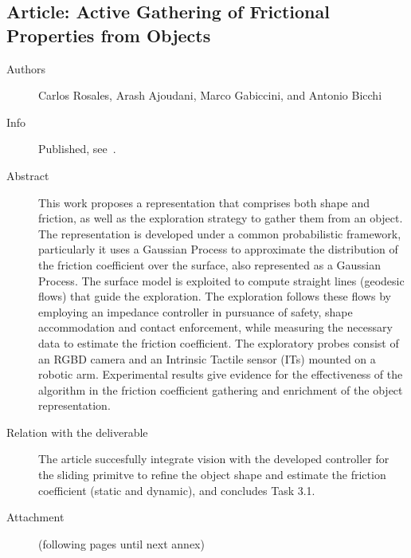 \documentclass[a4paper,11pt,pdf]{pacmanreport}
\begin{document}
\subsection{Article: Active Gathering of Frictional Properties from Objects} \label{sec:slidingPointClouds}
\begin{description}
	\item[Authors] Carlos Rosales, Arash Ajoudani, Marco Gabiccini, and Antonio Bicchi
	\item[Info] Published, see~\cite{Rosales2014Active}.
	\item[Abstract] This work proposes a representation that comprises both shape and friction, as well as the exploration strategy to gather them from an object. The representation is developed under a common probabilistic framework, particularly it uses a Gaussian Process to approximate the distribution of the friction coefficient over the surface, also represented as a Gaussian Process. The surface model is exploited to compute straight lines (geodesic flows) that guide the exploration. The exploration follows these flows by employing an impedance
controller in pursuance of safety, shape accommodation and contact enforcement, while measuring the necessary data to estimate the friction coefficient. The exploratory probes consist of an RGBD camera and an Intrinsic Tactile sensor (ITs) mounted on a robotic arm. Experimental results give evidence for the effectiveness of the algorithm in the friction coefficient gathering and enrichment of the object representation.
	\item[Relation with the deliverable] The article succesfully integrate vision with the developed controller for the sliding primitve to refine the object shape and estimate the friction coefficient (static and dynamic), and concludes Task 3.1.
	\item[Attachment] (following pages until next annex)
\end{description}

\end{document}
